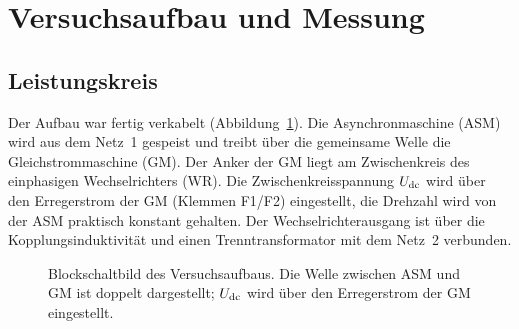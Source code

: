 \section{Versuchsaufbau und Messung}
\label{sec:aufbau}

\subsection{Leistungskreis}

Der Aufbau war fertig verkabelt (Abbildung~\ref{fig:blockschaltbild}). Die Asynchronmaschine (ASM) wird aus dem Netz~1 gespeist und treibt über die gemeinsame Welle die Gleichstrommaschine (GM). Der Anker der GM liegt am Zwischenkreis des einphasigen Wechselrichters (WR). Die Zwischenkreisspannung $U_{\mathrm{dc}}$ wird über den Erregerstrom der GM (Klemmen F1/F2) eingestellt, die Drehzahl wird von der ASM praktisch konstant gehalten. Der Wechselrichterausgang ist über die Kopplungsinduktivität und einen Trenntransformator mit dem Netz~2 verbunden.

\begin{figure}[htbp]
  \centering
  \caption{Blockschaltbild des Versuchsaufbaus. Die Welle zwischen ASM und GM ist doppelt dargestellt; $U_{\mathrm{dc}}$ wird über den Erregerstrom der GM eingestellt.}
  \label{fig:blockschaltbild}
\end{figure}

